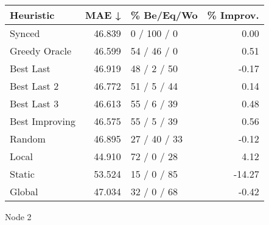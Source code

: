 \begin{tabular}{lrlr}
\toprule
\textbf{Heuristic} & \textbf{MAE ↓} & \textbf{\% Be/Eq/Wo} & \textbf{\% Improv.} \\
\midrule
            Synced &         46.839 &          0 / 100 / 0 &                0.00 \\
     Greedy Oracle &         46.599 &          54 / 46 / 0 &                0.51 \\
         Best Last &         46.919 &          48 / 2 / 50 &               -0.17 \\
       Best Last 2 &         46.772 &          51 / 5 / 44 &                0.14 \\
       Best Last 3 &         46.613 &          55 / 6 / 39 &                0.48 \\
    Best Improving &         46.575 &          55 / 5 / 39 &                0.56 \\
            Random &         46.895 &         27 / 40 / 33 &               -0.12 \\
             Local &         44.910 &          72 / 0 / 28 &                4.12 \\
            Static &         53.524 &          15 / 0 / 85 &              -14.27 \\
            Global &         47.034 &          32 / 0 / 68 &               -0.42 \\
\bottomrule
\end{tabular}
\caption{Node 2}
\label{tab:non_lr01_le2_bs4_2}
